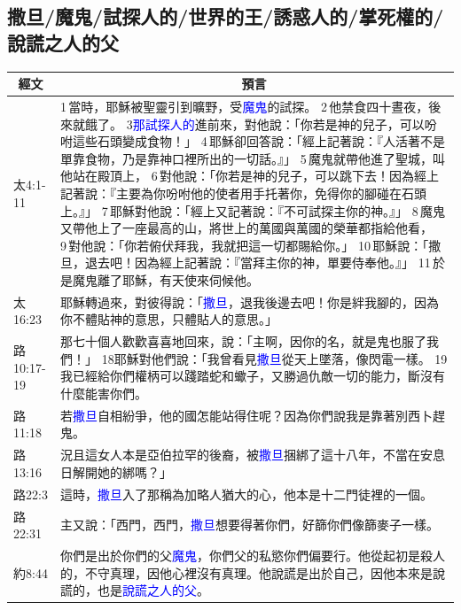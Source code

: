 \subsection{撒旦/魔鬼/試探人的/世界的王/誘惑人的/掌死權的/說謊之人的父}
\begin{table}[H]
\centering
\begin{tabular}{p{1.6cm}|p{}}\hline\hline
\multicolumn{1}{c|}{經文}&\multicolumn{1}{c}{預言}\\\hline
太4:1-11&1 當時，耶穌被聖靈引到曠野，受\textcolor{blue}{魔鬼}的試探。 2 他禁食四十晝夜，後來就餓了。 3\textcolor{blue}{那試探人的}進前來，對他說：「你若是神的兒子，可以吩咐這些石頭變成食物！」 4 耶穌卻回答說：「經上記著說：『人活著不是單靠食物，乃是靠神口裡所出的一切話。』」 5 魔鬼就帶他進了聖城，叫他站在殿頂上， 6 對他說：「你若是神的兒子，可以跳下去！因為經上記著說：『主要為你吩咐他的使者用手托著你，免得你的腳碰在石頭上。』」 7 耶穌對他說：「經上又記著說：『不可試探主你的神。』」 8 魔鬼又帶他上了一座最高的山，將世上的萬國與萬國的榮華都指給他看， 9 對他說：「你若俯伏拜我，我就把這一切都賜給你。」 10 耶穌說：「撒旦，退去吧！因為經上記著說：『當拜主你的神，單要侍奉他。』」 11 於是魔鬼離了耶穌，有天使來伺候他。\\\hline

太16:23&耶穌轉過來，對彼得說：「\textcolor{blue}{撒旦}，退我後邊去吧！你是絆我腳的，因為你不體貼神的意思，只體貼人的意思。」\\\hline

路10:17-19&那七十個人歡歡喜喜地回來，說：「主啊，因你的名，就是鬼也服了我們！」 18耶穌對他們說：「我曾看見\textcolor{blue}{撒旦}從天上墜落，像閃電一樣。 19我已經給你們權柄可以踐踏蛇和蠍子，又勝過仇敵一切的能力，斷沒有什麼能害你們。\\\hline

路11:18&若\textcolor{blue}{撒旦}自相紛爭，他的國怎能站得住呢？因為你們說我是靠著別西卜趕鬼。\\\hline

路13:16&況且這女人本是亞伯拉罕的後裔，被\textcolor{blue}{撒旦}捆綁了這十八年，不當在安息日解開她的綁嗎？」\\\hline
  
路22:3&這時，\textcolor{blue}{撒旦}入了那稱為加略人猶大的心，他本是十二門徒裡的一個。\\\hline

路22:31&主又說：「西門，西門，\textcolor{blue}{撒旦}想要得著你們，好篩你們像篩麥子一樣。\\\hline
  
約8:44&你們是出於你們的父\textcolor{blue}{魔鬼}，你們父的私慾你們偏要行。他從起初是殺人的，不守真理，因他心裡沒有真理。他說謊是出於自己，因他本來是說謊的，也是\textcolor{blue}{說謊之人的父}。\\\hline


\end{tabular}
\end{table}
